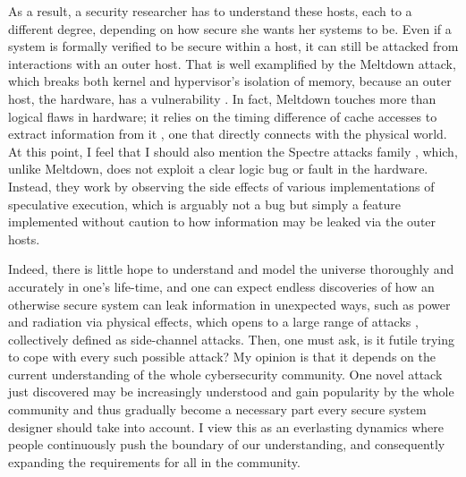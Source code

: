 \documentclass{article}
\begin{document}
As a result, a security researcher has to understand these hosts, each to a
different degree, depending on how secure she wants her systems to be. Even if
a system is formally verified to be secure within a host, it can still be
attacked from interactions with an outer host. That is well examplified by
the Meltdown attack, which breaks both kernel and hypervisor's isolation of
memory, because an outer host, the hardware, has a vulnerability
\cite{meltdown}. In fact, Meltdown touches more than logical flaws in hardware;
it relies on the timing difference of cache accesses to extract information
from it \cite{flush.reload}, one that directly connects with the physical
world. At this point, I feel that I should also mention the Spectre attacks
family \cite{spectre}, which, unlike Meltdown, does not exploit a clear logic
bug or fault in the hardware. Instead, they work by observing the side effects
of various implementations of speculative execution, which is arguably not a
bug but simply a feature implemented without caution to how information may be
leaked via the outer hosts.

Indeed, there is little hope to understand and model the universe thoroughly
and accurately in one's life-time, and one can expect endless discoveries of
how an otherwise secure system can leak information in unexpected ways, such as
power and radiation via physical effects, which opens to a large range of
attacks \cite{side.channel.1, side.channel.2, side.channel.3, flush.reload},
collectively defined as side-channel attacks.  Then, one must ask, is it futile
trying to cope with every such possible attack? My opinion is that it depends
on the current understanding of the whole cybersecurity community. One novel
attack just discovered may be increasingly understood and gain popularity by
the whole community and thus gradually become a necessary part every secure
system designer should take into account. I view this as an everlasting
dynamics where people continuously push the boundary of our understanding, and
consequently expanding the requirements for all in the community.
\end{document}

